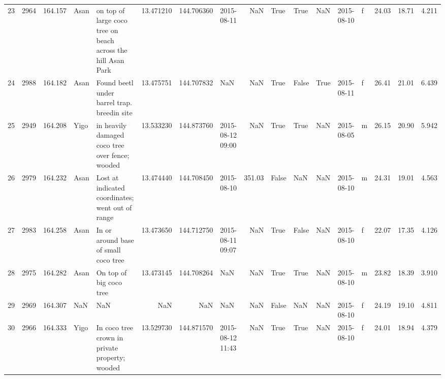 \begin{tabular}{lrrllrrlrlllllrrr}
23 &       2964 &    164.157 &     Asan &                           on top of large coco tree on beach across the hill Asan Park &  13.471210 &  144.706360 &           2015-08-11 &                     NaN &              True &    True &           NaN &       2015-08-10 &   f &   24.03 &  18.71 &   4.211 \\
24 &       2988 &    164.182 &     Asan &                                            Found beetl under barrel trap. breedin site &  13.475751 &  144.707832 &                  NaN &                     NaN &              True &   False &          True &       2015-08-11 &   f &   26.41 &  21.01 &   6.439 \\
25 &       2949 &    164.208 &     Yigo &                                        in heavily damaged coco tree over fence; wooded &  13.533230 &  144.873760 &     2015-08-12 09:00 &                     NaN &              True &    True &           NaN &       2015-08-05 &   m &   26.15 &  20.90 &   5.942 \\
26 &       2979 &    164.232 &     Asan &                                       Lost at indicated coordinates; went out of range &  13.474440 &  144.708450 &           2015-08-10 &                  351.03 &             False &     NaN &           NaN &       2015-08-10 &   m &   24.31 &  19.01 &   4.563 \\
27 &       2983 &    164.258 &     Asan &                                                   In or around base of small coco tree &  13.473650 &  144.712750 &     2015-08-11 09:07 &                     NaN &              True &   False &           NaN &       2015-08-10 &   f &   22.07 &  17.35 &   4.126 \\
28 &       2975 &    164.282 &     Asan &                                                                On top of big coco tree &  13.473145 &  144.708264 &                  NaN &                     NaN &              True &    True &           NaN &       2015-08-10 &   m &   23.82 &  18.39 &   3.910 \\
29 &       2969 &    164.307 &      NaN &                                                                                    NaN &        NaN &         NaN &                  NaN &                     NaN &             False &     NaN &           NaN &       2015-08-10 &   f &   24.19 &  19.10 &   4.811 \\
30 &       2966 &    164.333 &     Yigo &                                         In coco tree crown in private property; wooded &  13.529730 &  144.871570 &     2015-08-12 11:43 &                     NaN &              True &    True &           NaN &       2015-08-10 &   f &   24.01 &  18.94 &   4.379 \\

\end{tabular}
